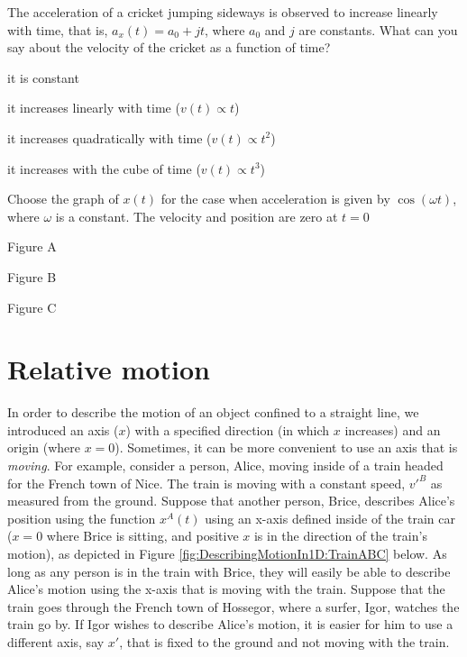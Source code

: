 \begin{checkpoint}
\begin{MCquestion}{The acceleration of a cricket jumping sideways is observed to increase linearly with time, that is, $a_x(t)=a_0+jt$, where $a_0$ and $j$ are constants. What can you say about the velocity of the cricket as a function of time?}
\item it is constant
\item it increases linearly with time ($v(t)\propto t$)
\item it increases quadratically with time ($v(t)\propto t^2$) %
\item it increases with the cube of time ($v(t)\propto t^3$)
\end{MCquestion}
\end{checkpoint}

\begin{checkpoint}
\begin{MCquestion}{Choose the graph of $x(t)$ for the case when acceleration is given by $\cos(\omega t)$, where $\omega$ is a constant. The velocity and position are zero at $t=0$
}
\item Figure A
\item Figure B
\item Figure C %
\end{MCquestion}
\end{checkpoint}



\section{Relative motion}
In order to describe the motion of an object confined to a straight line, we introduced an axis ($x$) with a specified direction (in which $x$ increases) and an origin (where $x=0$). Sometimes, it can be more convenient to use an axis that is \textit{moving}. For example, consider a person, Alice, moving inside of a train headed for the French town of Nice. The train is moving with a constant speed, $v'^B$ as measured from the ground. Suppose that another person, Brice, describes Alice's position using the function $x^A(t)$ using an x-axis defined inside of the train car ($x=0$ where Brice is sitting, and positive $x$ is in the direction of the train's motion), as depicted in Figure \ref{fig:DescribingMotionIn1D:TrainABC} below. As long as any person is in the train with Brice, they will easily be able to describe Alice's motion using the x-axis that is moving with the train. Suppose that the train goes through the French town of Hossegor, where a surfer, Igor, watches the train go by. If Igor wishes to describe Alice's motion, it is easier for him to use a different axis, say $x'$, that is fixed to the ground and not moving with the train. 

